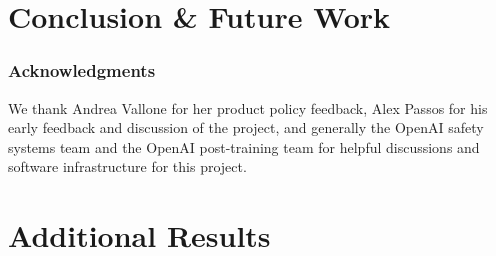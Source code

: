 \documentclass{article} %
\begin{document}
\section{Conclusion \& Future Work}\label{sec:concl}

\subsubsection*{Acknowledgments} We thank Andrea Vallone for her product policy feedback, Alex Passos for his early feedback and discussion of the project, and generally the OpenAI safety systems team and the OpenAI post-training team for helpful discussions and software infrastructure for this project.




\clearpage
\appendix
\section{Additional Results}\label{sec:appendix}
\end{document}
